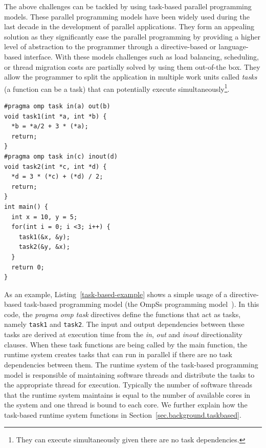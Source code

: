 The above challenges can be tackled by using task-based parallel programming models.
These parallel programming models have been widely used during the last decade in the development of parallel applications.
They form an appealing solution as they significantly ease the parallel programming by providing a higher level of abstraction to the programmer through a directive-based or language-based interface.
With these models challenges such as load balancing, scheduling, or thread migration costs are partially solved by using them out-of-the box.
They allow the programmer to split the application in multiple work units called \textit{tasks} (a function can be a task) that can potentially execute simultaneously\footnote{They can execute simultaneously given there are no task dependencies.}.
\begin{lstlisting}[float, caption={Example code using the OmpSs task-based programming model.},
label=task-based-example]
#pragma omp task in(a) out(b)
void task1(int *a, int *b) {
  *b = *a/2 + 3 * (*a);
  return;
}
#pragma omp task in(c) inout(d)
void task2(int *c, int *d) {
  *d = 3 * (*c) + (*d) / 2;
  return;
}
int main() { 
  int x = 10, y = 5;
  for(int i = 0; i <3; i++) {
    task1(&x, &y);
    task2(&y, &x);
  }
  return 0;
}
\end{lstlisting}
As an example, Listing~\ref{task-based-example} shows a simple usage of a directive-based task-based programming model (the OmpSs programming model~\cite{OmpSs}).
In this code, the \textit{pragma omp task} directives define the functions that act as tasks, namely \texttt{task1} and \texttt{task2}.
The input and output dependencies between these tasks are derived at execution time from the \textit{in}, \textit{out} and \textit{inout} directionality clauses.
When these task functions are being called by the main function, the runtime system creates tasks that can run in parallel if there are no task dependencies between them.
The runtime system of the task-based programming model is responsible of maintaining software threads and distribute the tasks to the appropriate thread for execution.
Typically the number of software threads that the runtime system maintains is equal to the number of available cores in the system and one thread is bound to each core.
We further explain how the task-based runtime system functions in Section~\ref{sec.background.taskbased}.


